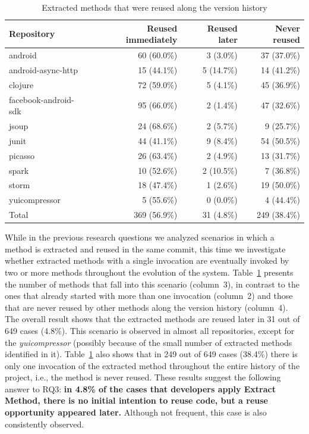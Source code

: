 \begin{table}[htbp]\centering
\renewcommand{\arraystretch}{1.3}
\caption{Extracted methods that were reused along the version history}
\begin{tabular}{@{}lrrr@{}}\toprule
Repository & Reused immediately & Reused later & Never reused\\
\midrule
android & 60 (60.0\%) & 3 (3.0\%) & 37 (37.0\%) \\
android-async-http & 15 (44.1\%) & 5 (14.7\%) & 14 (41.2\%) \\
clojure & 72 (59.0\%) & 5 (4.1\%) & 45 (36.9\%) \\
facebook-android-sdk & 95 (66.0\%) & 2 (1.4\%) & 47 (32.6\%) \\
jsoup & 24 (68.6\%) & 2 (5.7\%) & 9 (25.7\%) \\
junit & 44 (41.1\%) & 9 (8.4\%) & 54 (50.5\%) \\
picasso & 26 (63.4\%) & 2 (4.9\%) & 13 (31.7\%) \\
spark & 10 (52.6\%) & 2 (10.5\%) & 7 (36.8\%) \\
storm & 18 (47.4\%) & 1 (2.6\%) & 19 (50.0\%) \\
yuicompressor & 5 (55.6\%) & 0 (0.0\%) & 4 (44.4\%) \\
\midrule
Total & 369 (56.9\%) & 31 (4.8\%) & 249 (38.4\%) \\
\bottomrule
\end{tabular}
\label{treusetime}
\end{table}


While in the previous research questions we analyzed scenarios in which a method is extracted and reused in the same commit, this time we investigate whether extracted methods with a single invocation are eventually invoked by two or more methods throughout the evolution of the system. 
Table~\ref{treusetime} presents the number of methods that fall into this scenario (column~3), in contrast to the ones that already started with more than one invocation (column~2) and those that are never reused by other methods along the version history (column~4). The overall result shows that the extracted methods are reused later in 31 out of 649 cases (4.8\%). This scenario is observed in almost all repositories, except for the \textit{yuicompressor} (possibly because of the small number of extracted methods identified in it).
Table~\ref{treusetime} also shows that in 249 out of 649 cases (38.4\%) there is only one invocation of the extracted method throughout the entire history of the project, i.e., the method is never reused.
These results suggest the following answer to RQ3: \textbf{in 4.8\% of the cases that developers apply Extract Method, there is no initial intention to reuse code, but a reuse opportunity appeared later.} Although not frequent, this case is also consistently observed.


